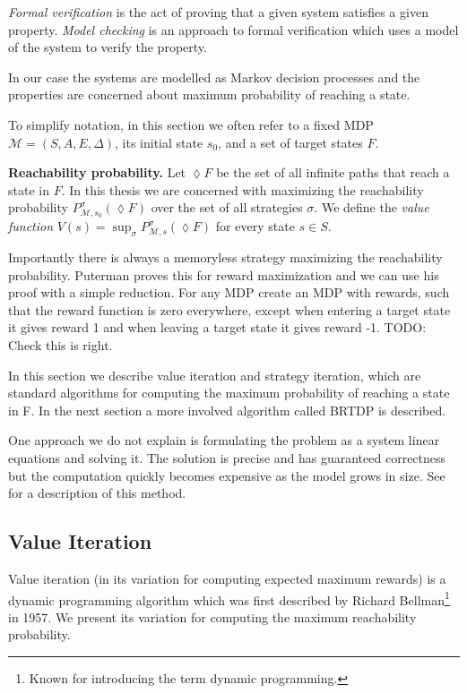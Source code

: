 {\em Formal verification} is the act of proving that a given system satisfies
a given property. {\em Model
checking} is an approach to formal verification which uses a model of
the system to verify the property.

In our case the systems are modelled as Markov decision processes and
the properties are concerned about maximum probability of reaching a state.

To simplify notation, in this section we often refer to a fixed MDP $\mathcal{M} =
(S,A,E,\Delta)$, its initial state $s_0$, and a set of target states $F$.

\noindent \textbf{Reachability probability.}
Let $\lozenge F$ be the set of all infinite paths that reach a state in $F$.
In this thesis we are concerned with maximizing the reachability
probability $P^\sigma_{\mathcal{M},s_0}(\lozenge F)$ over the set of all
strategies $\sigma$.
We define the {\em value function} $V(s) = \sup_{\sigma}
P^\sigma_{\mathcal{M},s}(\lozenge F)$ for every state $s \in S$.

Importantly there is always a memoryless strategy maximizing the
reachability probability. Puterman \parencite{puterman} proves this for
reward maximization and we can use his proof with a simple reduction.
For any MDP create an MDP with rewards, such that the reward function
is zero everywhere, except when entering a target state it gives reward 1
and when leaving a target state it gives reward -1. TODO: Check this is
right.

In this section we describe value iteration and strategy iteration,
which are standard algorithms for computing the maximum probability of
reaching a state in F. In the next section a more involved algorithm
called BRTDP is described.

One approach we do not explain is formulating the problem as a system
linear equations and solving it. The solution is precise and has
guaranteed correctness but the computation quickly becomes expensive as
the model grows in size.  See \parencite{forejt} for a description of
this method.

\subsection{Value Iteration}

Value iteration (in its variation for computing expected maximum rewards) is a
dynamic programming algorithm which was first described by Richard
Bellman\footnote{Known for introducing the term dynamic programming.}
\parencite{bellman} in 1957. We present its variation for computing the maximum
reachability probability.

